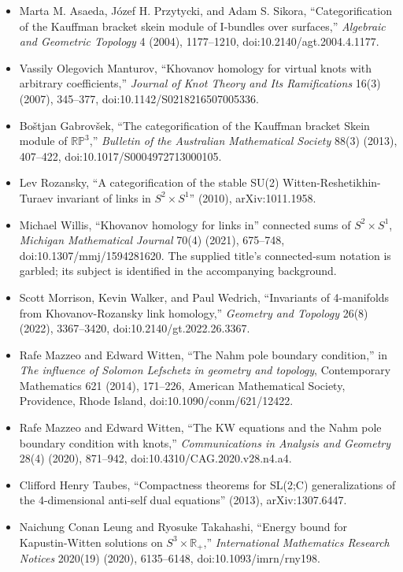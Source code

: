 \documentclass[11pt]{article}
\newcommand{\R}{\mathbb{R}}
\begin{document}
\begin{itemize}
\item [APS04] Marta M. Asaeda, Józef H. Przytycki, and Adam S. Sikora, ``Categorification of the Kauffman bracket skein module of I-bundles over surfaces,'' \emph{Algebraic and Geometric Topology} 4 (2004), 1177--1210, doi:10.2140/agt.2004.4.1177.
\item [Man07] Vassily Olegovich Manturov, ``Khovanov homology for virtual knots with arbitrary coefficients,'' \emph{Journal of Knot Theory and Its Ramifications} 16(3) (2007), 345--377, doi:10.1142/S0218216507005336.
\item [Gab13] Boštjan Gabrovšek, ``The categorification of the Kauffman bracket Skein module of $\mathbb{RP}^3$,'' \emph{Bulletin of the Australian Mathematical Society} 88(3) (2013), 407--422, doi:10.1017/S0004972713000105.
\item [Roz10] Lev Rozansky, ``A categorification of the stable SU(2) Witten-Reshetikhin-Turaev invariant of links in $S^2\times S^1$'' (2010), arXiv:1011.1958.
\item [Wil21] Michael Willis, ``Khovanov homology for links in'' connected sums of $S^2\times S^1$, \emph{Michigan Mathematical Journal} 70(4) (2021), 675--748, doi:10.1307/mmj/1594281620. The supplied title's connected-sum notation is garbled; its subject is identified in the accompanying background.
\item [MWW22] Scott Morrison, Kevin Walker, and Paul Wedrich, ``Invariants of 4-manifolds from Khovanov-Rozansky link homology,'' \emph{Geometry and Topology} 26(8) (2022), 3367--3420, doi:10.2140/gt.2022.26.3367.
\item [MW14] Rafe Mazzeo and Edward Witten, ``The Nahm pole boundary condition,'' in \emph{The influence of Solomon Lefschetz in geometry and topology}, Contemporary Mathematics 621 (2014), 171--226, American Mathematical Society, Providence, Rhode Island, doi:10.1090/conm/621/12422.
\item [MW20] Rafe Mazzeo and Edward Witten, ``The KW equations and the Nahm pole boundary condition with knots,'' \emph{Communications in Analysis and Geometry} 28(4) (2020), 871--942, doi:10.4310/CAG.2020.v28.n4.a4.
\item [Tau13] Clifford Henry Taubes, ``Compactness theorems for SL(2;C) generalizations of the 4-dimensional anti-self dual equations'' (2013), arXiv:1307.6447.
\item [LT20] Naichung Conan Leung and Ryosuke Takahashi, ``Energy bound for Kapustin-Witten solutions on $S^3\times\R_+$,'' \emph{International Mathematics Research Notices} 2020(19) (2020), 6135--6148, doi:10.1093/imrn/rny198.

\end{itemize}
\end{document}
